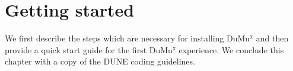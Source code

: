 \chapter{Getting started}

We first describe the steps which are necessary for installing DuMu$^\text{x}$ 
and then provide a quick start guide for the first DuMu$^\text{x}$ experience. 
We conclude this chapter with a copy of the DUNE coding guidelines. 





